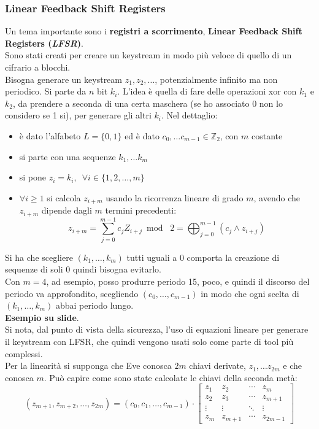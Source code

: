 \documentclass[a4paper,12pt, oneside]{book}
\begin{document}
\subsubsection{Linear Feedback Shift Registers}
Un tema importante sono i \textbf{registri a scorrimento}, \textbf{Linear
  Feedback Shift Registers (\textit{LFSR})}.\\
Sono stati creati per creare un keystream in modo più veloce di quello di un
cifrario a blocchi.\\
Bisogna generare un keystream $z_1,z_2,\ldots$, potenzialmente infinito ma non
periodico. Si parte da $n$ bit $k_i$. L'idea è quella di fare delle operazioni
xor con $k_1$ e $k_2$, da prendere a seconda di una certa maschera (se ho
associato 0 non lo considero se 1 si), per generare
gli altri $k_i$. Nel dettaglio:
\begin{itemize}
  \item è dato l'alfabeto $L=\{0,1\}$ ed è dato $c_0,\ldots
  c_{m-1}\in\mathbb{Z}_2$, con $m$ costante
  \item si parte con una sequenze $k_1,\ldots k_m$
  \item si pone $z_i=k_i,\,\,\,\forall i\in\{1,2,\ldots,m\}$ 
  \item $\forall i\geq 1$ si calcola $z_{i+m}$ usando la ricorrenza lineare di
  grado $m$, avendo che $z_{i+m}$ dipende dagli $m$ termini precedenti:
  \[z_{i+m}=\sum_{j=0}^{m-1}c_jZ_{i+j}\bmod\,\,2=\bigoplus_{j=0}^{m-1}(c_j\land
    z_{i+j})\] 
\end{itemize}
Si ha che scegliere $(k_1,\ldots,k_m)$ tutti uguali a 0 comporta la creazione di
sequenze di soli 0 quindi bisogna evitarlo.\\
Con $m=4$, ad esempio, posso produrre periodo 15, poco, e quindi il discorso del
periodo va approfondito, scegliendo $(c_0,\ldots,c_{m-1})$ in modo che ogni scelta
di $(k_1,\ldots,k_m)$ abbai periodo lungo.\\
\textbf{Esempio su slide}.\\
Si nota, dal punto di vista della sicurezza, l'uso di equazioni lineare per
generare il keystream con LFSR, che quindi vengono usati solo come parte di
tool più complessi. \\
Per la linearità si supponga che Eve conosca $2m$ chiavi derivate, $z_1,\ldots
z_{2m}$ e che conosca $m$. Può capire come sono state calcolate le chiavi della
seconda metà:
\[(z_{m+1},z_{m+2},\ldots, z_{2m})=(c_0,c_1,\ldots,c_{m-1})\cdot
  \left[
    \begin{matrix}
      z_1 & z_2 &\cdots &z_m\\
      z_2 & z_3 &\cdots &z_{m+1}\\
      \vdots & \vdots &\ddots &\vdots\\
      z_m & z_{m+1} &\cdots &z_{2m-1}
    \end{matrix}
  \right]
\]
\end{document}
